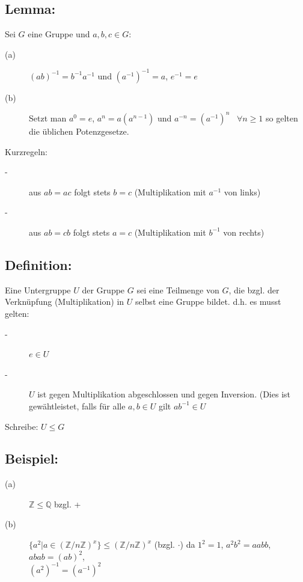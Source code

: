 \subsection{Lemma:}
Sei $G$ eine Gruppe und $a,b,c \in G$:
\begin{description}
	\item[(a)] $(ab)^{-1} = b^{-1}a^{-1}$ und $(a^{-1})^{-1} = a$, $e^{-1}=e$
	\item[(b)] Setzt man $a^{0}=e$, $a^{n}=a(a^{n-1})$ und $a^{-n} = (a^{-1})^{n}$ \ $\forall n \geq 1$ so gelten die 
			üblichen Potenzgesetze.
\end{description}
Kurzregeln:
\begin{description}
	\item[-] aus $ab=ac$ folgt stets $b=c$ (Multiplikation mit $a^{-1}$ von links)
	\item[-] aus $ab=cb$ folgt stets $a=c$ (Multiplikation mit $b^{-1}$ von rechts)
\end{description}
%
%
%
\subsection{Definition:}
Eine Untergruppe $U$ der Gruppe $G$ sei eine Teilmenge von $G$, die bzgl. der Verknüpfung (Multiplikation) in $U$ selbst eine Gruppe bildet. d.h. es musst gelten:
\begin{description}
	\item[-] $e \in U$
	\item[-] $U$ ist gegen Multiplikation abgeschlossen und gegen Inversion. (Dies ist gewähtleistet, falls für alle $a,b \in U$ 
			gilt $ab^{-1} \in U$
\end{description}
Schreibe: $U \leq G$
%
%
%
\subsection{Beispiel:}
\begin{description}
	\item[(a)] $\mathbb{Z} \leq \mathbb{Q}$ bzgl. +
	\item[(b)] $\{a^{2}|a \in (\mathbb{Z}/n\mathbb{Z})^{x}\} \leq (\mathbb{Z}/n\mathbb{Z})^{x}$ (bzgl. $\cdot$)
			da $1^{2} = 1$, $a^{2}b^{2} = aabb$, $abab = (ab)^{2}$,\\
			 $(a^{2})^{-1} = (a^{-1})^{2}$
\end{description}
%
%
%
